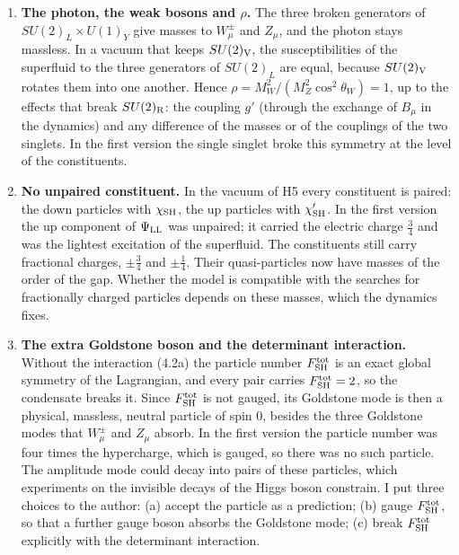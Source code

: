 \documentclass[
  10pt,
]{article}
\providecommand{\tightlist}{%
  \setlength{\itemsep}{0pt}\setlength{\parskip}{0pt}}
\begin{document}
\begin{enumerate}
\def\labelenumi{\arabic{enumi}.}
\tightlist
\item
  \textbf{The photon, the weak bosons and \(\rho\).} The three broken
  generators of \(SU(2)_L\times U(1)_Y\) give masses to \(W^\pm_\mu\)
  and \(Z_\mu\), and the photon stays massless. In a vacuum that keeps
  \(SU(2)_{\rm V}\), the susceptibilities of the superfluid to the three
  generators of \(SU(2)_L\) are equal, because \(SU(2)_{\rm V}\) rotates
  them into one another. Hence \(\rho=M_W^2/(M_Z^2\cos^2\theta_W)=1\),
  up to the effects that break \(SU(2)_{\rm R}\): the coupling \(g'\)
  (through the exchange of \(B_\mu\) in the dynamics) and any difference
  of the masses or of the couplings of the two singlets. In the first
  version the single singlet broke this symmetry at the level of the
  constituents.
\item
  \textbf{No unpaired constituent.} In the vacuum of H5 every
  constituent is paired: the down particles with \(\chi_{\rm SH}\), the
  up particles with \(\chi'_{\rm SH}\). In the first version the up
  component of \(\Psi_{\rm LL}\) was unpaired; it carried the electric
  charge \(\tfrac34\) and was the lightest excitation of the superfluid.
  The constituents still carry fractional charges, \(\pm\tfrac34\) and
  \(\pm\tfrac14\). Their quasi-particles now have masses of the order of
  the gap. Whether the model is compatible with the searches for
  fractionally charged particles depends on these masses, which the
  dynamics fixes.
\item
  \textbf{The extra Goldstone boson and the determinant interaction.}
  Without the interaction (4.2a) the particle number
  \(F^{\rm tot}_{\rm SH}\) is an exact global symmetry of the
  Lagrangian, and every pair carries \(F^{\rm tot}_{\rm SH}=2\), so the
  condensate breaks it. Since \(F^{\rm tot}_{\rm SH}\) is not gauged,
  its Goldstone mode is then a physical, massless, neutral particle of
  spin 0, besides the three Goldstone modes that \(W^\pm_\mu\) and
  \(Z_\mu\) absorb. In the first version the particle number was four
  times the hypercharge, which is gauged, so there was no such particle.
  The amplitude mode could decay into pairs of these particles, which
  experiments on the invisible decays of the Higgs boson constrain. I
  put three choices to the author: (a) accept the particle as a
  prediction; (b) gauge \(F^{\rm tot}_{\rm SH}\), so that a further
  gauge boson absorbs the Goldstone mode; (c) break
  \(F^{\rm tot}_{\rm SH}\) explicitly with the determinant interaction.

\end{enumerate}
\end{document}
